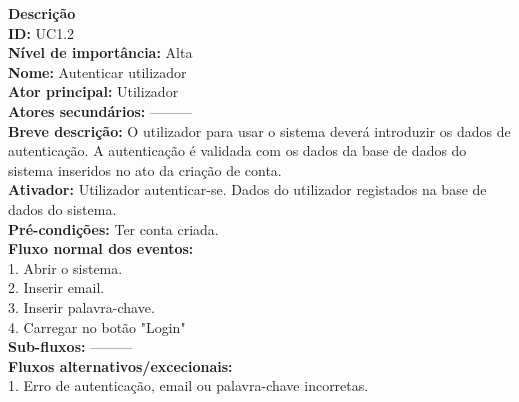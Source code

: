 \noindent \textbf{Descrição} \\
\textbf{ID:} UC1.2 \\  
\textbf{Nível de importância:} Alta \\
\textbf{Nome:} Autenticar utilizador \\
\textbf{Ator principal:} Utilizador \\
\textbf{Atores secundários:} --------- \\
\textbf{Breve descrição:} O utilizador para usar o sistema deverá introduzir os dados de autenticação. A autenticação é validada com os dados da base de dados do sistema inseridos no ato da criação de conta. \\ 
\textbf{Ativador:} Utilizador autenticar-se.  Dados do utilizador registados na base de dados do sistema. \\
\textbf{Pré-condições:} Ter conta criada. \\
\textbf{Fluxo normal dos eventos:} \\
1. Abrir o sistema.  \\
2. Inserir email. \\
3. Inserir palavra-chave. \\
4. Carregar no botão "Login"  \\
\textbf{Sub-fluxos:} --------- \\
\textbf{Fluxos alternativos/excecionais:}  \\
1. Erro de autenticação, email ou palavra-chave incorretas. \\